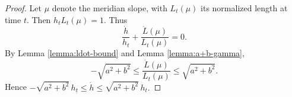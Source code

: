 \begin{proof}
Let $\mu$ denote the meridian slope, with $L_t(\mu)$ its normalized
length at time $t$.  Then $h_t L_t(\mu) = 1$.  Thus
$$\frac{\dot{h}}{h_t} + \frac{\dot{L}(\mu)}{L_t(\mu)} = 0.$$
By Lemma \ref{lemma:ldot-bound} and Lemma \ref{lemma:a+b-gamma},
$$-\sqrt{a^2+b^2} \leq \frac{\dot{L}(\mu)}{L_t(\mu)} \leq
\sqrt{a^2+b^2}.$$ Hence
$ -\sqrt{a^2+b^2}\,h_t \leq \dot{h} \leq
\sqrt{a^2+b^2}\,h_t.$





\end{proof}


